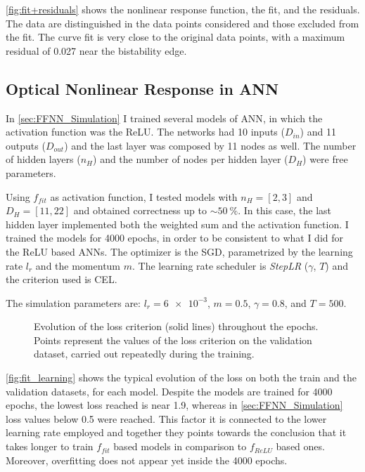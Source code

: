 \autoref{fig:fit+residuals} shows the nonlinear response function, the fit, and the residuals.
The data are distinguished in the data points considered and those excluded from the fit.
The curve fit is very close to the original data points, with a maximum residual of \num{0.027} near the bistability edge.


\newpage
\subsection{Optical Nonlinear Response in ANN}
\label{ssec:Optical_Nonlinear_Response_in_ANN}
In \autoref{sec:FFNN_Simulation} I trained several models of \ac{ANN}, in which the activation function was the \ac{ReLU}.
The networks had \num{10} inputs ($D_{in}$) and \num{11} outputs ($D_{out}$) and the last layer was composed by \num{11} nodes as well.
The number of hidden layers ($n_H$) and the number of nodes per hidden layer ($D_H$) were free parameters.

Using $f_{fit}$ as activation function, I tested models with $n_H=[2,3]$ and $D_H=[11,22]$ and obtained correctness up to $\sim\SI{50}{\percent}$.
In this case, the last hidden layer implemented both the weighted sum and the activation function.
I trained the models for 4000 epochs, in order to be consistent to what I did for the \ac{ReLU} based \acp{ANN}.
The optimizer is the \ac{SGD}, parametrized by the learning rate $l_r$ and the momentum $m$.
The learning rate scheduler is \textit{StepLR} ($\gamma$, $T$) and the criterion used is \ac{CEL}.

The simulation parameters are: $l_r=\num{6e-3}$, $m=0.5$, $\gamma=0.8$, and $T=500$.

\begin{figure}[htbp]
	\centering
	
	\caption{Evolution of the loss criterion (solid lines) throughout the epochs.
		Points represent the values of the loss criterion on the validation dataset, carried out repeatedly during the training.
	}
	\label{fig:fit_learning}
\end{figure}

\autoref{fig:fit_learning} shows the typical evolution of the loss on both the train and the validation datasets, for each model.
Despite the models are trained for \num{4000} epochs, the lowest loss reached is near \num{1.9}, whereas in \autoref{sec:FFNN_Simulation} loss values below \num{0.5} were reached.
This factor it is connected to the lower learning rate employed and together they points towards the conclusion that it takes longer to train $f_{fit}$ based models in comparison to $f_{ReLU}$ based ones.
Moreover, overfitting does not appear yet inside the \num{4000} epochs.

